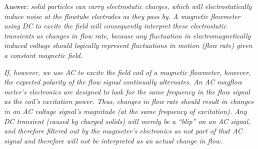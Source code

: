 \vskip 10pt

Answer: {\it solid particles can carry electrostatic charges, which will electrostatically induce noise at the flowtube electrodes as they pass by.  A magnetic flowmeter using DC to excite the field will consequently interpret these electrostatic transients as changes in flow rate, because any fluctuation in electromagnetically induced voltage should logically represent fluctuations in motion (flow rate) given a constant magnetic field.}

{\it If, however, we use AC to excite the field coil of a magnetic flowmeter, however, the expected polarity of the flow signal continually alternates.  An AC magflow meter's electronics are designed to look for the same frequency in the flow signal as the coil's excitation power.  Thus, changes in flow rate should result in changes in an AC voltage signal's magnitude (at the same frequency of excitation).  Any DC transient (caused by charged solids) will merely be a ``blip'' on an AC signal, and therefore filtered out by the magmeter's electronics as not part of that AC signal and therefore will not be interpreted as an actual change in flow.}








